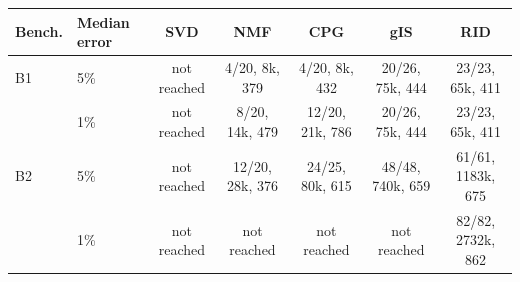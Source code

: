 \begin{tabular}{@{}llccccc@{}}
\toprule
Bench. & Median error & SVD & NMF & CPG & gIS & RID \\
\midrule
B1 & 5\% & not reached & 4/20, 8k, 379 & 4/20, 8k, 432 & 20/26, 75k, 444 & 23/23, 65k, 411 \\
 & 1\% & not reached & 8/20, 14k, 479 & 12/20, 21k, 786 & 20/26, 75k, 444 & 23/23, 65k, 411 \\
\midrule
B2 & 5\% & not reached & 12/20, 28k, 376 & 24/25, 80k, 615 & 48/48, 740k, 659 & 61/61, 1183k, 675 \\
 & 1\% & not reached & not reached & not reached & not reached & 82/82, 2732k, 862 \\
\bottomrule
\end{tabular}
